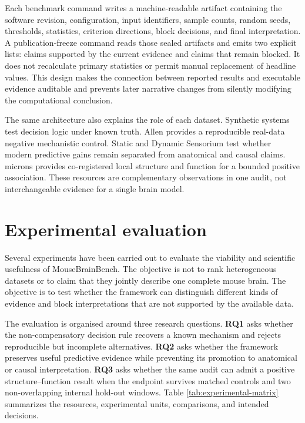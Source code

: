 \documentclass[a4paper,fleqn]{cas-sc}
\begin{document}
Each benchmark command writes a machine-readable artifact containing the
software revision, configuration, input identifiers, sample counts, random
seeds, thresholds, statistics, criterion directions, block decisions, and final
interpretation. A publication-freeze command reads those sealed artifacts and
emits two explicit lists: claims supported by the current evidence and claims
that remain blocked. It does not recalculate primary statistics or permit
manual replacement of headline values. This design makes the connection between
reported results and executable evidence auditable and prevents later narrative
changes from silently modifying the computational conclusion.

The same architecture also explains the role of each dataset. Synthetic systems
test decision logic under known truth. Allen provides a reproducible real-data
negative mechanistic control. Static and Dynamic Sensorium test whether modern
predictive gains remain separated from anatomical and causal claims. \acs{microns}
provides co-registered local structure and function for a bounded positive
association. These resources are complementary observations in one audit, not
interchangeable evidence for a single brain model.

\section{Experimental evaluation}
\label{sec:evaluation}

Several experiments have been carried out to evaluate the viability and
scientific usefulness of MouseBrainBench. The objective is not to rank
heterogeneous datasets or to claim that they jointly describe one complete mouse
brain. The objective is to test whether the framework can distinguish different
kinds of evidence and block interpretations that are not supported by the
available data.

The evaluation is organised around three research questions. \textbf{RQ1} asks
whether the non-compensatory decision rule recovers a known mechanism and
rejects reproducible but incomplete alternatives. \textbf{RQ2} asks whether the
framework preserves useful predictive evidence while preventing its promotion to
anatomical or causal interpretation. \textbf{RQ3} asks whether the same audit can
admit a positive structure--function result when the endpoint survives matched
controls and two non-overlapping internal hold-out windows. Table
\ref{tab:experimental-matrix} summarizes the resources, experimental units,
comparisons, and intended decisions.
\end{document}

